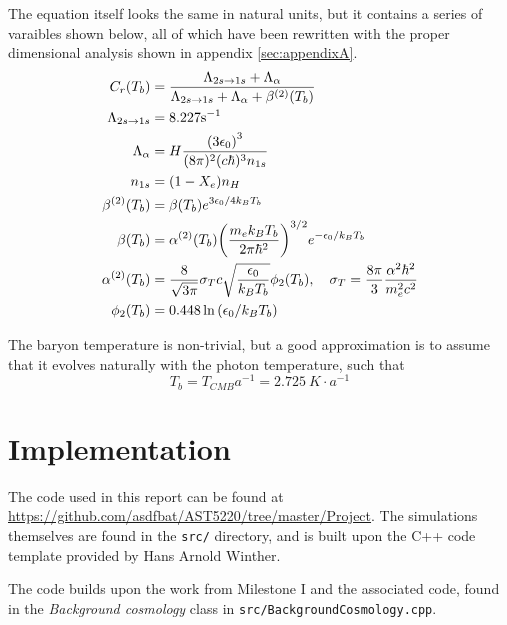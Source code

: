 \documentclass[10pt, a4paper]{article}
\begin{document}
The equation itself looks the same in natural units, but it contains a series of varaibles shown below, all of which have been rewritten with the proper dimensional analysis shown in appendix \ref{sec:appendixA}.
\begin{align}
    \label{eqn:1x}
    C_{r}\qty(T_{b}) &=\frac{\Lambda_{2 s \rightarrow 1 s}+\Lambda_{\alpha}}{\Lambda_{2 s \rightarrow 1 s}+\Lambda_{\alpha}+\beta^{(2)}\qty(T_{b})} \\
    \label{eqn:2x}
    \Lambda_{2 s \rightarrow 1 s} &=8.227 \mathrm{s}^{-1} \\
    \label{eqn:4x}
    \Lambda_{\alpha} &= H \frac{\qty(3 \epsilon_{0})^{3}}{(8 \pi)^{2} (c\hbar)^3 n_{1 s}} \\
    \label{eqn:5x}
    n_{1 s} &=\qty(1-X_{e}) n_{H} \\
    \label{eqn:6x}
    \beta^{(2)}\qty(T_{b}) &=\beta\qty(T_{b}) e^{3 \epsilon_{0} / 4 k_B T_{b}} \\
    \label{eqn:7x}
    \beta\qty(T_{b}) &= \alpha^{(2)}\qty(T_{b}) \qty(\frac{m_{e} k_B T_{b}}{2 \pi \hbar^2})^{3 / 2} e^{-\epsilon_{0} / k_BT_{b}} \\
    \label{eqn:8x}
    \alpha^{(2)}\qty(T_{b}) &= \frac{8}{\sqrt{3 \pi}} \sigma_T c \sqrt{\frac{\epsilon_{0}}{k_B T_{b}}} \phi_{2}\qty(T_{b}), \quad \sigma_{T}=\frac{8 \pi}{3} \frac{\alpha^{2} \hbar^{2}}{m_{e}^{2} c^{2}} \\
    \label{eqn:9x}
    \phi_{2}\qty(T_{b}) &=0.448 \ln \qty(\epsilon_{0} / k_B T_{b})
\end{align}

The baryon temperature is non-trivial, but a good approximation \cite{Euler} is to assume that it evolves naturally with the photon temperature, such that
\begin{equation*}
    T_{b} = T_{CMB}a^{-1} = \SI{2.725}{K}\cdot a^{-1}
\end{equation*}


\section{Implementation}
The code used in this report can be found at \url{https://github.com/asdfbat/AST5220/tree/master/Project}. The simulations themselves are found in the \texttt{src/} directory, and is built upon the C++ code template provided by Hans Arnold Winther.

The code builds upon the work from Milestone I \cite{Milestone1} and the associated code, found in the \textit{Background cosmology} class in \texttt{src/BackgroundCosmology.cpp}.
\end{document}
